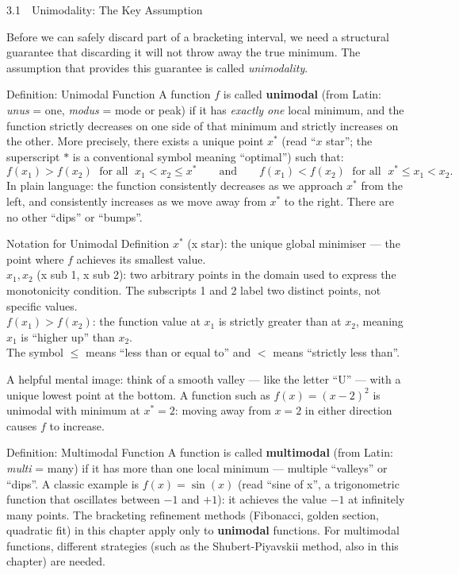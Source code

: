 \documentclass[aspectratio=169,10pt]{beamer}
\begin{document}
\begin{frame}[allowframebreaks]{3.1\ \ Unimodality: The Key Assumption}

  Before we can safely discard part of a bracketing interval, we need a
  structural guarantee that discarding it will not throw away the true minimum.
  The assumption that provides this guarantee is called \emph{unimodality}.

  \begin{block}{Definition: Unimodal Function}
    A function $f$ is called \textbf{unimodal} (from Latin: \emph{unus} = one,
    \emph{modus} = mode or peak) if it has \emph{exactly one} local minimum,
    and the function strictly decreases on one side of that minimum and strictly
    increases on the other.  More precisely, there exists a unique point $x^{*}$
    (read ``$x$ star''; the superscript $*$ is a conventional symbol meaning
    ``optimal'') such that:
    \[
      f(x_1) > f(x_2) \;\text{ for all }\; x_1 < x_2 \le x^{*}
      \qquad\text{and}\qquad
      f(x_1) < f(x_2) \;\text{ for all }\; x^{*} \le x_1 < x_2.
    \]
    In plain language: the function consistently decreases as we approach
    $x^{*}$ from the left, and consistently increases as we move away from
    $x^{*}$ to the right.  There are no other ``dips'' or ``bumps''.
  \end{block}

  \begin{block}{Notation for Unimodal Definition}
    $x^{*}$ (x star): the unique global minimiser --- the point where $f$
    achieves its smallest value.\\
    $x_1, x_2$ (x sub 1, x sub 2): two arbitrary points in the domain used
    to express the monotonicity condition.  The subscripts 1 and 2 label two
    distinct points, not specific values.\\
    $f(x_1) > f(x_2)$: the function value at $x_1$ is strictly greater than
    at $x_2$, meaning $x_1$ is ``higher up'' than $x_2$.\\
    The symbol $\le$ means ``less than or equal to'' and $<$ means ``strictly
    less than''.
  \end{block}

  A helpful mental image: think of a smooth valley --- like the letter ``U''
  --- with a unique lowest point at the bottom.  A function such as
  $f(x) = (x - 2)^2$ is unimodal with minimum at $x^{*} = 2$: moving away
  from $x = 2$ in either direction causes $f$ to increase.

  \begin{block}{Definition: Multimodal Function}
    A function is called \textbf{multimodal} (from Latin: \emph{multi} = many)
    if it has more than one local minimum --- multiple ``valleys'' or ``dips''.
    A classic example is $f(x) = \sin(x)$ (read ``sine of x'', a trigonometric
    function that oscillates between $-1$ and $+1$): it achieves the value $-1$
    at infinitely many points.  The bracketing refinement methods (Fibonacci,
    golden section, quadratic fit) in this chapter apply only to
    \textbf{unimodal} functions.  For multimodal functions, different strategies
    (such as the Shubert-Piyavskii method, also in this chapter) are needed.
  \end{block}


\end{frame}
\end{document}
